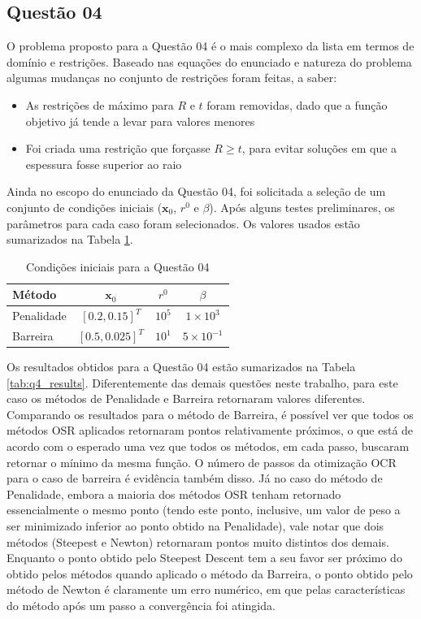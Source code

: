 \documentclass[10pt, a4paper]{article}
\begin{document}
\newpage

\subsection{Questão 04}

O problema proposto para a Questão 04 é o mais complexo da lista em termos de domínio e restrições. Baseado nas equações do enunciado e natureza do problema algumas mudanças no conjunto de restrições foram
feitas, a saber:

\begin{itemize}
  \item As restrições de máximo para $R$ e $t$ foram removidas, dado que a função objetivo já tende a levar para valores menores
  \item Foi criada uma restrição que forçasse $R \ge t$, para evitar soluções em que a espessura fosse superior ao raio
\end{itemize}

Ainda no escopo do enunciado da Questão 04, foi solicitada a seleção de um conjunto de condições iniciais ($\mathbf{x}_0$, $r^0$ e $\beta$). Após alguns testes preliminares, os parâmetros para cada caso
foram selecionados. Os valores usados estão sumarizados na Tabela \ref{tab:q4_initial}.

\begin{table}[htpb]
  \centering
  \begin{tabular}{|l|c|c|c|}
    \hline
    \textbf{Método} & $\mathbf{x}_0$   & $r^0$  & $\beta$          \\
    \hline
    Penalidade      & $[0.2, 0.15]^T$  & $10^5$ & $1\times10^3$    \\
    \hline
    Barreira        & $[0.5, 0.025]^T$ & $10^1$ & $5\times10^{-1}$ \\
    \hline
  \end{tabular}
  \caption{Condições iniciais para a Questão 04}
  \label{tab:q4_initial}
\end{table}

Os resultados obtidos para a Questão 04 estão sumarizados na Tabela \ref{tab:q4_results}. Diferentemente das demais questões neste trabalho, para este caso os métodos de Penalidade e Barreira retornaram valores
diferentes. Comparando os resultados para o método de Barreira, é possível ver que todos os métodos OSR aplicados retornaram pontos relativamente próximos, o que está de acordo com o esperado uma vez que todos
os métodos, em cada passo, buscaram retornar o mínimo da mesma função. O número de passos da otimização OCR para o caso de barreira é evidência também disso.
Já no caso do método de Penalidade, embora a maioria dos métodos OSR tenham retornado essencialmente o mesmo ponto (tendo este ponto, inclusive, um valor de peso a ser minimizado inferior ao ponto obtido na 
Penalidade), vale notar que dois métodos (Steepest e Newton) retornaram pontos muito distintos dos demais. Enquanto o ponto obtido pelo Steepest Descent tem a seu favor ser próximo do obtido pelos métodos quando
aplicado o método da Barreira, o ponto obtido pelo método de Newton é claramente um erro numérico, em que pelas características do método após um passo a convergência foi atingida.
\end{document}
